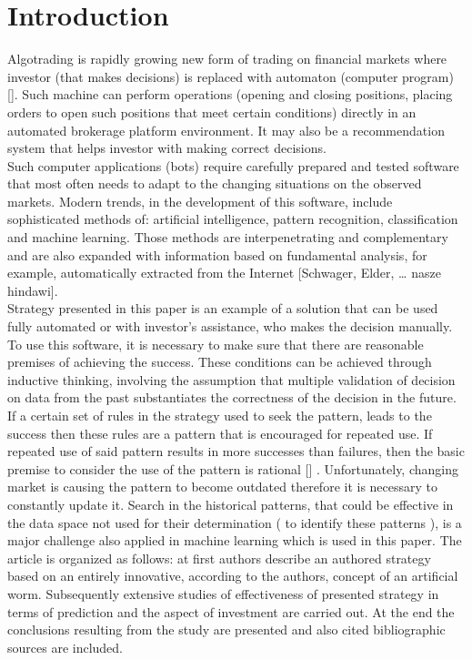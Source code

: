 \documentclass[runningheads,a4paper]{llncs}
\begin{document}
\section{Introduction}

Algotrading is rapidly growing new form of trading on financial markets where investor (that makes decisions) is replaced with automaton (computer program) []. Such machine can perform operations (opening and closing positions, placing orders to open such positions that meet certain conditions) directly in an automated brokerage platform environment. It may also be a recommendation system that helps investor with making correct decisions.\\

Such computer applications (bots) require carefully prepared and tested software that most often needs to adapt to the changing situations on the observed markets. Modern trends, in the development of this software, include sophisticated methods of: artificial intelligence, pattern recognition, classification and machine learning. Those methods are interpenetrating and complementary and are also expanded with information based on fundamental analysis, for example, automatically extracted from the Internet \cite{elder} [Schwager, Elder, … nasze hindawi].\\

Strategy presented in this paper is an example of a solution that can be used fully automated or with investor’s assistance, who makes the decision manually. To use this software, it is necessary to make sure that there are reasonable premises of achieving the success. These conditions can be achieved through inductive thinking, involving the assumption that multiple validation of decision on data from the past substantiates the correctness of the decision in the future. If a certain set of rules in the strategy used to seek the pattern, leads to the success then these rules are a pattern that is encouraged for repeated use. If repeated use of said pattern results in more successes than failures, then the basic premise to consider the use of the pattern is rational [] \cite{elder} \cite{burke} \cite{burke}. Unfortunately, changing market is causing the pattern to become outdated therefore it is necessary to constantly update it. Search in the historical patterns, that could be effective in the data space not used for their determination ( to identify these patterns ), is a major challenge also applied in machine learning which is used in this paper.
The article is organized as follows: at first authors describe an authored strategy based on an entirely innovative, according to the authors, concept of an artificial worm. Subsequently extensive studies of effectiveness of presented strategy in terms of prediction and the aspect of investment are carried out. At the end the conclusions resulting from the study are presented and also cited bibliographic sources are included.
\end{document}
